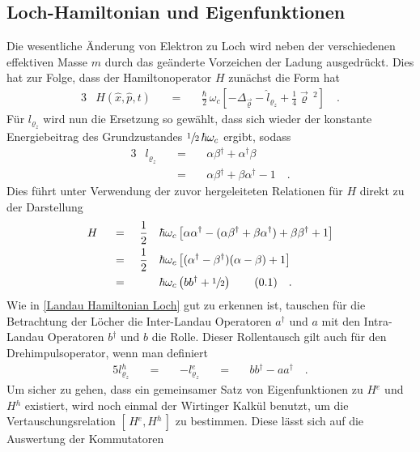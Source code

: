 \documentclass[a4paper,11pt]{article}
\newcommand{\ind}[2]{{_{#1}^{#2}}}
\newcommand{\+}{\dagger}
\newcommand{\com}[2]{[\, #1, #2 \,]}
\newcommand\numberthis{\stepcounter{equation} \tag{\thesection.\theequation}}
\renewcommand{\v}{\vec}
\renewcommand{\^}{\hat}
\renewcommand{\~}{\widetilde}
\begin{document}
\subsection{Loch-Hamiltonian und Eigenfunktionen}
Die wesentliche Änderung von Elektron zu Loch wird neben der verschiedenen effektiven Masse $m$ durch das geänderte Vorzeichen der Ladung ausgedrückt. Dies hat zur Folge, dass der Hamiltonoperator $H$ zunächst die Form hat 
\begin{alignat*}{3}
& H(\^ x,\^ p,t) && \ = \ && \frac{\hbar }{2}\,\omega_c \left [ -\Delta_{\v \varrho} - \^l_{\varrho_z}  +\frac{1}{4}\v \varrho \,^2 \right]\quad .
\end{alignat*}
Für $l_{\varrho_z}$ wird nun die Ersetzung so gewählt, dass sich wieder der konstante Energiebeitrag des Grundzustandes $\sfrac{1}{2}\,\hbar \omega_c$ ergibt, sodass 
\begin{alignat*}{3}
& l_{\varrho_z} &&\ = \ &&\alpha\beta\ind{}{\+} + \alpha\ind{}{\+}\beta \\
& &&\ =\ &&\alpha\beta\ind{}{\+} + \beta\alpha\ind{}{\+} -1 \quad .
\end{alignat*}
Dies führt unter Verwendung der zuvor hergeleiteten Relationen für $H$ direkt zu der Darstellung 
\begin{alignat*}{4}
& H &&\ = \ && \frac{1}{2}&&\hbar\omega_c \left [\alpha\alpha\ind{}{\+} -( \alpha\beta\ind{}{\+} +\beta\alpha\ind{}{\+})+\beta\beta\ind{}{\+}+1\right ] \\
& &&\ = \ && \frac{1}{2}&&\hbar\omega_c \left [(\alpha\ind{}{\+}-\beta\ind{}{\+})(\alpha-\beta)+1\right ] \\
& &&\ = \ && &&\hbar\omega_c \left (bb\ind{}{\+}+\sfrac{1}{2}\right )\numberthis \label{Landau Hamiltonian Loch} \quad .
\end{alignat*}
Wie in \eqref{Landau Hamiltonian Loch} gut zu erkennen ist, tauschen für die Betrachtung der Löcher die Inter-Landau Operatoren $a\ind{}{\+}$ und $a$ mit den Intra-Landau Operatoren $b\ind{}{\+}$ und $b$ die Rolle. Dieser Rollentausch gilt auch für den Drehimpulsoperator, wenn man definiert 
\begin{alignat*}{5}
l\ind{\varrho_z}{h} &&\ =\ && -l\ind{\varrho_z}{e} &&\ = \ && bb\ind{}{\+}-aa\ind{}{\+} \quad .
\end{alignat*}
Um sicher zu gehen, dass ein gemeinsamer Satz von Eigenfunktionen zu $H\ind{}{e}$ und $H\ind{}{h}$ existiert, wird noch einmal der Wirtinger Kalkül benutzt, um die Vertauschungsrelation $\com{H\ind{}{e}}{H\ind{}{h}}$ zu bestimmen. Diese lässt sich auf die Auswertung der Kommutatoren 
\end{document}

